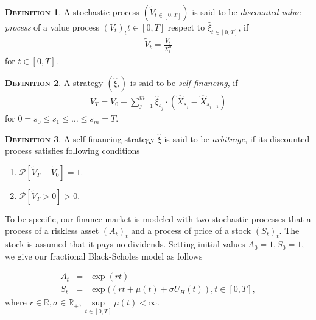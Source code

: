 \documentclass[a4paper, twoside, 11pt]{article}
\theoremstyle{definition}
\newtheorem{definition}{\scshape Definition}[section]
\begin{document}
\begin{definition}
  A stochastic process $(\tilde{V}_{t\in[0,T]})$ is said to be \emph{discounted value process} of a value process $(V_t)_t{t\in [0, T]}$ respect to $\hat{\xi}_{t\in [0, T]}$, if 
  \begin{eqnarray*}
	\tilde{V}_t = \frac{V_t}{X_t^0}
  \end{eqnarray*}
  for $t \in [0, T]$.
\end{definition}

\begin{definition}
  A strategy $(\hat{\xi}_t)$ is said to be \emph{self-financing}, if
  \begin{eqnarray}
	V_T = V_0 + \sum_{j=1}^m \hat{\xi}_{s_j}\cdot (\hat{X}_{s_j} - \hat{X}_{s_{j-1}}) 
	\label{sec:123}
  \end{eqnarray}
  \label{sec:def}
  for $0=s_0\le s_1\le \dots\le s_m=T$.
\end{definition}

\begin{definition}
  A self-financing strategy $\hat{\xi}$ is said to be \emph{arbitrage}, if its discounted process satisfies following conditions
  \begin{enumerate}[topsep=0pt, itemsep=-1ex, partopsep=1ex, parsep=1ex, label=(\roman*)]
	\item $\mathcal{P}[\tilde{V}_T - \tilde{V}_0]=1$.
	\item $\mathcal{P}[\tilde{V}_T > 0] > 0$.
	\end{enumerate}
  \end{definition}
To be specific, our finance market is modeled with two stochastic processes that a process of a riskless asset $(A_t)_t$ and a process of price of a stock $(S_t)_t$.  The stock is assumed that it pays no dividends. Setting initial values $A_0=1, S_0=1$, we give our fractional Black-Scholes model as follows

\begin{eqnarray}
  A_t &=& \exp(rt)\nonumber\\
  S_t &=& \exp((rt + \mu(t) +\sigma U_H(t)), t\in [0, T],
  \label{sec:fbs2}
\end{eqnarray}
where  $r\in\mathbb{R}, \sigma\in\mathbb{R}_+, \sup\limits_{t\in[0, T]}\mu(t) < \infty$.
\end{document}
